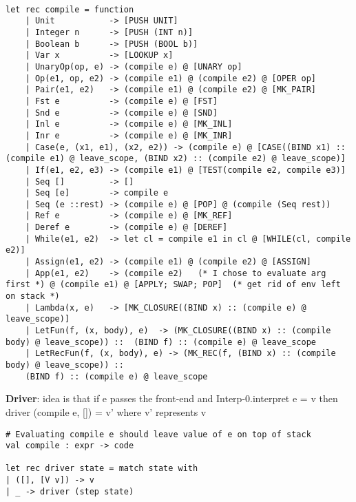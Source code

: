 \documentclass{article}
\begin{document}
\begin{lstlisting}
	
let rec compile = function 
	| Unit           -> [PUSH UNIT] 
	| Integer n      -> [PUSH (INT n)] 
	| Boolean b      -> [PUSH (BOOL b)] 
	| Var x          -> [LOOKUP x] 
	| UnaryOp(op, e) -> (compile e) @ [UNARY op]
	| Op(e1, op, e2) -> (compile e1) @ (compile e2) @ [OPER op] 
	| Pair(e1, e2)   -> (compile e1) @ (compile e2) @ [MK_PAIR] 
	| Fst e          -> (compile e) @ [FST] 
	| Snd e          -> (compile e) @ [SND] 
	| Inl e          -> (compile e) @ [MK_INL] 
	| Inr e          -> (compile e) @ [MK_INR] 
	| Case(e, (x1, e1), (x2, e2)) -> (compile e) @ [CASE((BIND x1) :: (compile e1) @ leave_scope, (BIND x2) :: (compile e2) @ leave_scope)]
	| If(e1, e2, e3) -> (compile e1) @ [TEST(compile e2, compile e3)]
	| Seq []         -> [] 
	| Seq [e]        -> compile e
	| Seq (e ::rest) -> (compile e) @ [POP] @ (compile (Seq rest))
	| Ref e          -> (compile e) @ [MK_REF] 
	| Deref e        -> (compile e) @ [DEREF] 
	| While(e1, e2)  -> let cl = compile e1 in cl @ [WHILE(cl, compile e2)]
	| Assign(e1, e2) -> (compile e1) @ (compile e2) @ [ASSIGN] 
	| App(e1, e2)    -> (compile e2)   (* I chose to evaluate arg first *) @ (compile e1) @ [APPLY; SWAP; POP]  (* get rid of env left on stack *) 
	| Lambda(x, e)   -> [MK_CLOSURE((BIND x) :: (compile e) @ leave_scope)]
	| LetFun(f, (x, body), e)  -> (MK_CLOSURE((BIND x) :: (compile body) @ leave_scope)) ::  (BIND f) :: (compile e) @ leave_scope
	| LetRecFun(f, (x, body), e) -> (MK_REC(f, (BIND x) :: (compile body) @ leave_scope)) ::  
	(BIND f) :: (compile e) @ leave_scope
\end{lstlisting}

\textbf{Driver}: idea is that if e passes the front-end and Interp-0.interpret e = v then driver (compile e, []) = v' where v' represents v
\begin{lstlisting}
# Evaluating compile e should leave value of e on top of stack
val compile : expr -> code

let rec driver state = match state with
| ([], [V v]) -> v
| _ -> driver (step state) 

\end{lstlisting}
\end{document}
